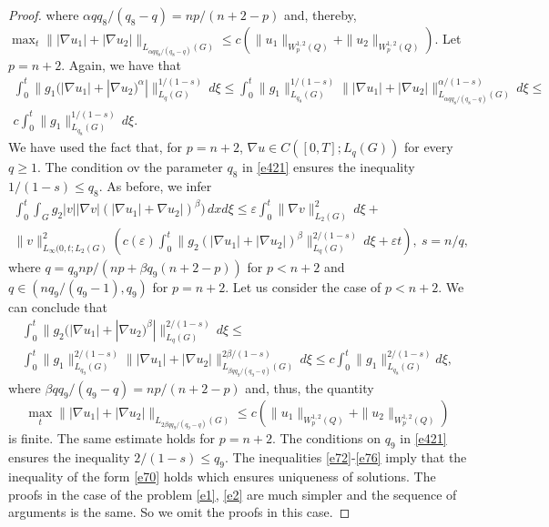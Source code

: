 \documentclass{article}
\theoremstyle{plain}
\begin{document}
\begin{proof}
where $\alpha qq_8/(q_8-q)=np/(n+2-p)$ and, thereby, 
$\max_t\||\nabla u_1|+|\nabla u_2|\|_{L_{\alpha qq_8/(q_8-q)}(G)}\leq c(\|u_1\|_{W_p^{1,2}(Q)}+\|u_2\|_{W_p^{1,2}(Q)})$. 
Let  $p=n+2$. Again, we have that 
\begin{multline}\label{e74}
\int_0^t \|g_1(|\nabla u_1|+|\nabla u_2)^\alpha|\|_{L_{q}(G)}^{1/(1-s)}\,d\xi \leq 
 \int_0^t \|g_1\|_{L_{q_8}(G)}^{1/(1-s)}
\||\nabla u_1|+|\nabla u_2|\|_{L_{\alpha qq_8/(q_8-q)}(G)}^{\alpha/(1-s)}\,d\xi\leq\\  c \int_0^t \|g_1\|_{L_{q_8}(G)}^{1/(1-s)}\,d\xi.
\end{multline} 
We have used the fact that,  for $p=n+2$, $\nabla u\in C([0,T];L_q(G))$ for every  $q\geq 1$. 
The condition ov the parameter  $q_8$  in \eqref{e421} ensures the inequality  $1/(1-s)\leq q_8$. 
As before, we infer
  \begin{multline}\label{e75}
 \int_0^t\int_G  g_2 |v| |\nabla v| (|\nabla u_1|+\nabla u_2|)^\beta)\,dxd\xi\leq 
  \varepsilon \int_0^t \|\nabla v\|_{L_{2}(G)}^{2}\,d\xi+ \\ \|v\|_{L_{\infty}(0,t;L_2(G)}^{2}(c(\varepsilon)\int_0^t \|g_2(|\nabla u_1|+|\nabla u_2|)^\beta\|_{L_{q}(G)}^{2/(1-s)}\,d\xi+\varepsilon t),\ s=n/q, 
\end{multline} 
where $q=q_9np/(np+\beta q_9(n+2-p))$ for  $p<n+2$ and $q\in (nq_9/(q_9-1),q_9)$ for $p=n+2$. 
Let us consider the case of  $p<n+2$. We can conclude that 
\begin{multline}\label{e76}
\int_0^t \|g_2(|\nabla u_1|+|\nabla u_2)^\beta|\|_{L_{q}(G)}^{2/(1-s)}\,d\xi \leq \\ \int_0^t \|g_1\|_{L_{q_9}(G)}^{2/(1-s)}
\||\nabla u_1|+|\nabla u_2|\|_{L_{\beta qq_9/(q_9-q)}(G)}^{2\beta/(1-s)}\,d\xi\leq c \int_0^t \|g_1\|_{L_{q_8}(G)}^{2/(1-s)}d\xi,
\end{multline} 
where  $\beta qq_9/(q_9-q)=np/(n+2-p)$ and, thus, the quantity 
$$\max_t\||\nabla u_1|+|\nabla u_2|\|_{L_{2\beta qq_9/(q_9-q)}(G)}\leq  c(\|u_1\|_{W_p^{1,2}(Q)}+\|u_2\|_{W_p^{1,2}(Q)})$$ is finite. 
The same estimate holds for  $p=n+2$. 
The conditions on  $q_9$ in \eqref{e421} ensures the inequality  $2/(1-s)\leq q_9$.
The inequalities  \eqref{e72}-\eqref{e76} imply that the inequality of the form  \eqref{e70} holds which ensures uniqueness of solutions. 
The proofs in the case of the problem  {\rm \eqref{e1}, \eqref{e2}} are much simpler and the sequence of arguments is the same.
So we omit the proofs in this case.   
 \end{proof}
\end{document}
